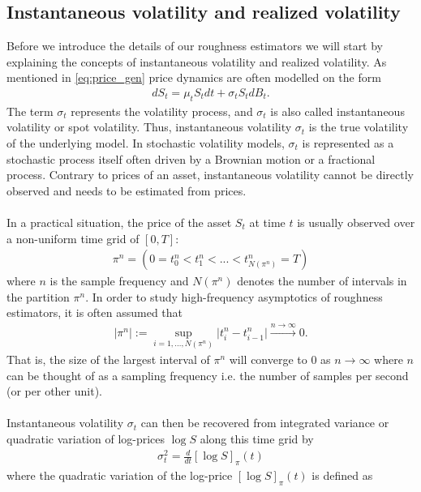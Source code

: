 \documentclass{article}
\begin{document}
\subsection{Instantaneous volatility and realized volatility}
Before we introduce the details of our roughness estimators we will start by explaining the concepts of instantaneous volatility and realized volatility. As mentioned in \eqref{eq:price_gen} price dynamics are often modelled on the form
\begin{align*}
dS_t = \mu_tS_t dt+\sigma_tS_t dB_t.
\end{align*}
The term $\sigma_t$ represents the volatility process, and $\sigma_t$ is also called instantaneous volatility or spot volatility. Thus, instantaneous volatility $\sigma_t$ is the true volatility of the underlying model. In stochastic volatility models, $\sigma_t$ is represented as a stochastic process itself often driven by a Brownian motion or a fractional process. Contrary to prices of an asset, instantaneous volatility cannot be directly observed and needs to be estimated from prices.\\\\
In a practical situation, the price of the asset $S_t$ at time $t$ is usually observed over a non-uniform time grid of $[0,T]$:
\begin{align*}
\pi^n = \left(0=t^n_0<t^n_1<...<t^n_{N(\pi^n)}=T\right)
\end{align*}
where $n$ is the sample frequency and $N(\pi^n)$ denotes the number of intervals in the partition $\pi^n$. In order to study high-frequency asymptotics of roughness estimators, it is often assumed that
\begin{align}
\lvert \pi^n \rvert := \sup_{i=1, \dots, N(\pi^n)} \lvert t_i^n - t_{i-1}^n \rvert  {\overset{n \to \infty}{\longrightarrow}} 0. \label{eq:time_assumption}
\end{align}
That is, the size of the largest interval of $\pi^n$ will converge to 0 as $n\rightarrow \infty$ where $n$ can be thought of as a sampling frequency i.e. the number of samples per second (or per other unit).\\\\
Instantaneous volatility $\sigma_t$ can then be recovered from integrated variance or quadratic variation of log-prices $\log S$ along this time grid by
\begin{align*}
\sigma_t^2 =  \frac{d}{dt} [\log S]_\pi (t)
\end{align*} 
where the quadratic variation of the log-price $[\log S]_\pi (t)$ is defined as 
\end{document}
